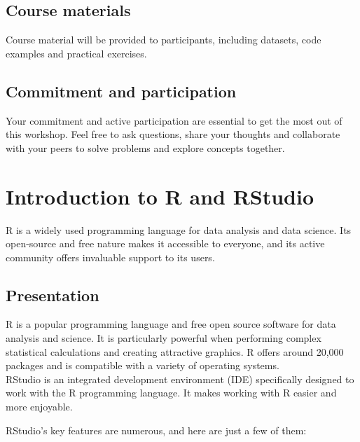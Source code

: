 \documentclass[
]{book}
\begin{document}
\hypertarget{course-materials}{%
\section*{Course materials}\label{course-materials}}

Course material will be provided to participants, including datasets, code examples and practical exercises.

\hypertarget{commitment-and-participation}{%
\section*{Commitment and participation}\label{commitment-and-participation}}

Your commitment and active participation are essential to get the most out of this workshop. Feel free to ask questions, share your thoughts and collaborate with your peers to solve problems and explore concepts together.

\hypertarget{introduction-to-r-and-rstudio}{%
\chapter{Introduction to R and RStudio}\label{introduction-to-r-and-rstudio}}

R is a widely used programming language for data analysis and data science. Its open-source and free nature makes it accessible to everyone, and its active community offers invaluable support to its users.

\hypertarget{presentation}{%
\section{Presentation}\label{presentation}}

R is a popular programming language and free open source software for data analysis and science. It is particularly powerful when performing complex statistical calculations and creating attractive graphics. R offers around 20,000 packages and is compatible with a variety of operating systems.\\

RStudio is an integrated development environment (IDE) specifically designed to work with the R programming language. It makes working with R easier and more enjoyable.

RStudio's key features are numerous, and here are just a few of them:\\
\end{document}
